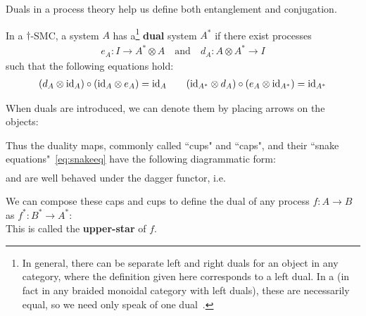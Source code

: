 Duals in a process theory help us define both entanglement and conjugation.

\begin{defn}
\label{def:dual}
In a $\dagger$-SMC, a system $A$ has a\footnote{In general, there can be separate left and right duals for an object in any category, where the definition given here corresponds to a left dual. In a \dsmc(in fact in any braided monoidal category with left duals), these are necessarily equal, so we need only speak of one dual~\cite[Prop.~7.2]{joyal1993braided}. } \textbf{dual} system $A^*$ if there exist processes 
\begin{align}
e_A:I\to A^*\otimes A \quad \mbox{and}\quad d_A:A\otimes A^*\to I
\end{align}
such that the following equations hold:
\begin{align}
\label{eq:snakeeq}
(d_A\otimes \mbox{id}_{A})\circ(\mbox{id}_{A}\otimes e_A) = \mbox{id}_{A} \qquad (\mbox{id}_{A^*}\otimes d_A)\circ(e_A\otimes \mbox{id}_{A^*})=\mbox{id}_{A^*}
\end{align}
\end{defn}

When duals are introduced, we can denote them by placing arrows on the objects:
\begin{equation}

\end{equation}

Thus the duality maps, commonly called ``cups" and ``caps", and their ``snake equations"~\eqref{eq:snakeeq} have the following diagrammatic form:
\begin{align}

\end{align}
\begin{equation}
\label{eq:snake}

\end{equation} 
\noindent and are well behaved under the dagger functor, i.e.
\begin{equation}

\end{equation}

We can compose these caps and cups to define the dual of any process $f:A\to B$ as $f^*:B^*\to A^*$:
\begin{equation}
\label{eq:dualmorph}

\end{equation}
This is called the \textbf{upper-star} of $f$.

